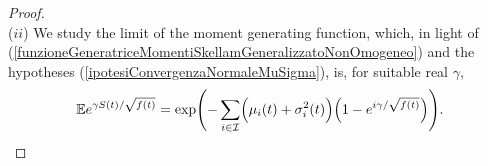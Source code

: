 \documentclass[12pt, twoside, english, headsepline]{article}
\newcommand{\floor}[1]{\left\lfloor #1 \right\rfloor}  %
\theoremstyle{definition} %
\numberwithin{equation}{section} %
\begin{document}
\begin{proof}
\\

($ii$) We study the limit of the moment generating function, which, in light of (\ref{funzioneGeneratriceMomentiSkellamGeneralizzatoNonOmogeneo}) and the hypotheses (\ref{ipotesiConvergenzaNormaleMuSigma}), is, for suitable real $\gamma$,
$$\mathbb{E}e^{\gamma S(t)/\sqrt{f(t)}} = \text{exp}\Biggl(- \sum_{i\in\mathcal{I}}\Bigl(\mu_i(t) +\sigma^2_i(t)\Bigr)\Bigl(1-e^{i \gamma/\sqrt{f(t)}}\Bigr) \Biggr). $$ 


\end{proof}
\end{document}
